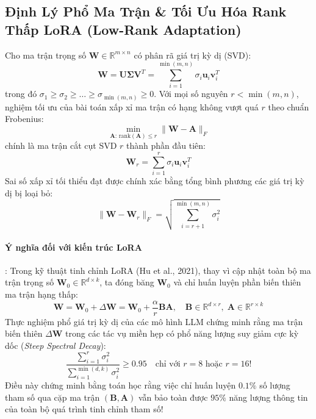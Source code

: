 \subsection{Định Lý Phổ Ma Trận \& Tối Ưu Hóa Rank Thấp LoRA (Low-Rank Adaptation)}
\begin{theorem}
Cho ma trận trọng số $\mathbf{W} \in \mathbb{R}^{m \times n}$ có phân rã giá trị kỳ dị (SVD):
\begin{equation}
\mathbf{W} = \mathbf{U} \mathbf{\Sigma} \mathbf{V}^T = \sum_{i=1}^{\min(m, n)} \sigma_i \mathbf{u}_i \mathbf{v}_i^T
\end{equation}
trong đó $\sigma_1 \ge \sigma_2 \ge \dots \ge \sigma_{\min(m, n)} \ge 0$.
Với mọi số nguyên $r < \min(m, n)$, nghiệm tối ưu của bài toán xấp xỉ ma trận có hạng không vượt quá $r$ theo chuẩn Frobenius:
\begin{equation}
\min_{\mathbf{A}: \, \text{rank}(\mathbf{A}) \le r} \|\mathbf{W} - \mathbf{A}\|_F
\end{equation}
chính là ma trận cắt cụt SVD $r$ thành phần đầu tiên:
\begin{equation}
\mathbf{W}_r = \sum_{i=1}^r \sigma_i \mathbf{u}_i \mathbf{v}_i^T
\end{equation}
Sai số xấp xỉ tối thiểu đạt được chính xác bằng tổng bình phương các giá trị kỳ dị bị loại bỏ:
\begin{equation}
\|\mathbf{W} - \mathbf{W}_r\|_F = \sqrt{\sum_{i=r+1}^{\min(m, n)} \sigma_i^2}
\end{equation}
\end{theorem}

\paragraph{Ý nghĩa đối với kiến trúc LoRA}:
Trong kỹ thuật tinh chỉnh LoRA (Hu et al., 2021), thay vì cập nhật toàn bộ ma trận trọng số $\mathbf{W}_0 \in \mathbb{R}^{d \times k}$, ta đóng băng $\mathbf{W}_0$ và chỉ huấn luyện phần biến thiên ma trận hạng thấp:
\begin{equation}
\mathbf{W} = \mathbf{W}_0 + \Delta \mathbf{W} = \mathbf{W}_0 + \frac{\alpha}{r} \mathbf{B}\mathbf{A}, \quad \mathbf{B} \in \mathbb{R}^{d \times r}, \; \mathbf{A} \in \mathbb{R}^{r \times k}
\end{equation}
Thực nghiệm phổ giá trị kỳ dị của các mô hình LLM chứng minh rằng ma trận biến thiên $\Delta \mathbf{W}$ trong các tác vụ miền hẹp có phổ năng lượng suy giảm cực kỳ dốc (\textit{Steep Spectral Decay}):
\begin{equation}
\frac{\sum_{i=1}^r \sigma_i^2}{\sum_{i=1}^{\min(d, k)} \sigma_i^2} \ge 0.95 \quad \text{chỉ với } r = 8 \text{ hoặc } r = 16!
\end{equation}
Điều này chứng minh bằng toán học rằng việc chỉ huấn luyện $0.1\%$ số lượng tham số qua cặp ma trận $(\mathbf{B}, \mathbf{A})$ vẫn bảo toàn được $95\%$ năng lượng thông tin của toàn bộ quá trình tinh chỉnh tham số!


